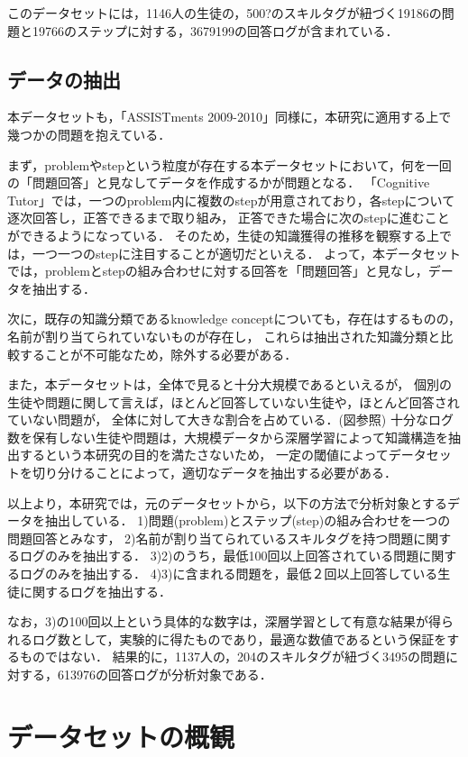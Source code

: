 このデータセットには，1146人の生徒の，500?のスキルタグが紐づく19186の問題と19766のステップに対する，3679199の回答ログが含まれている．


\subsection{データの抽出}
本データセットも，「ASSISTments 2009-2010」同様に，本研究に適用する上で幾つかの問題を抱えている．

まず，problemやstepという粒度が存在する本データセットにおいて，何を一回の「問題回答」と見なしてデータを作成するかが問題となる．
「Cognitive Tutor」では，一つのproblem内に複数のstepが用意されており，各stepについて逐次回答し，正答できるまで取り組み，
正答できた場合に次のstepに進むことができるようになっている．
そのため，生徒の知識獲得の推移を観察する上では，一つ一つのstepに注目することが適切だといえる．
よって，本データセットでは，problemとstepの組み合わせに対する回答を「問題回答」と見なし，データを抽出する．

次に，既存の知識分類であるknowledge conceptについても，存在はするものの，名前が割り当てられていないものが存在し，
これらは抽出された知識分類と比較することが不可能なため，除外する必要がある．

また，本データセットは，全体で見ると十分大規模であるといえるが，
個別の生徒や問題に関して言えば，ほとんど回答していない生徒や，ほとんど回答されていない問題が，
全体に対して大きな割合を占めている．(図参照)
十分なログ数を保有しない生徒や問題は，大規模データから深層学習によって知識構造を抽出するという本研究の目的を満たさないため，
一定の閾値によってデータセットを切り分けることによって，適切なデータを抽出する必要がある．


以上より，本研究では，元のデータセットから，以下の方法で分析対象とするデータを抽出している．
1)問題(problem)とステップ(step)の組み合わせを一つの問題回答とみなす，
2)名前が割り当てられているスキルタグを持つ問題に関するログのみを抽出する．
3)2)のうち，最低100回以上回答されている問題に関するログのみを抽出する．
4)3)に含まれる問題を，最低２回以上回答している生徒に関するログを抽出する．

なお，3)の100回以上という具体的な数字は，深層学習として有意な結果が得られるログ数として，実験的に得たものであり，最適な数値であるという保証をするものではない．
結果的に，1137人の，204のスキルタグが紐づく3495の問題に対する，613976の回答ログが分析対象である．



\section{データセットの概観}






